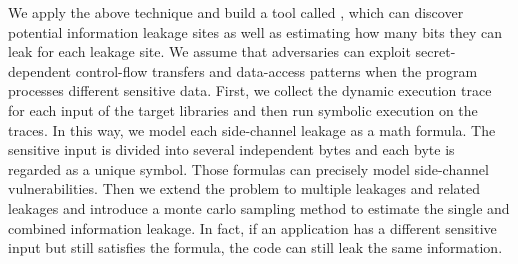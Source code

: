 We apply the above technique and build a tool called \tool{}, 
which can discover potential information leakage sites 
as well as estimating how many bits they can leak for each leakage site. 
We assume that adversaries can exploit secret-dependent control-flow transfers and 
data-access patterns when the program processes different sensitive data. 
First, we collect the dynamic execution trace for each input of the target libraries 
and then run symbolic execution on the traces. 
In this way, we model each side-channel leakage as a math formula. 
The sensitive input is divided into several independent bytes and each byte is regarded as 
a unique symbol. Those formulas can precisely model side-channel vulnerabilities.
Then we extend the problem to multiple leakages and related leakages
and introduce a monte carlo sampling method to estimate the single and combined information leakage.
In fact, if an application has a different sensitive input but still satisfies the formula, 
the code can still leak the same information. 





